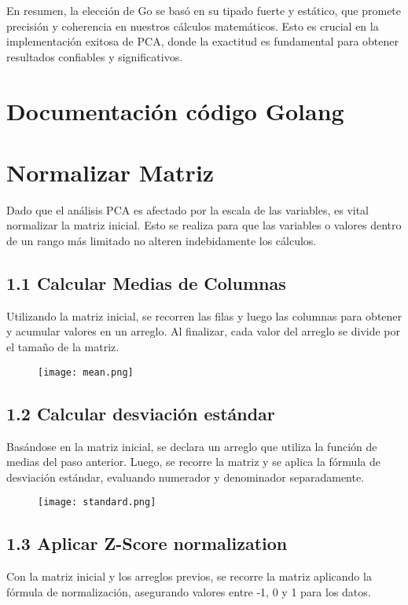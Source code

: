 \documentclass{article}
\begin{document}
En resumen, la elección de Go se basó en su tipado fuerte y estático, que promete precisión y coherencia en nuestros cálculos matemáticos. Esto es crucial en la implementación exitosa de PCA, donde la exactitud es fundamental para obtener resultados confiables y significativos.


\section*{Documentación código Golang}

\section{ Normalizar Matriz}Dado que el análisis PCA es afectado por la escala de las variables, es vital normalizar la matriz inicial. Esto se realiza para que las variables o valores dentro de un rango más limitado no alteren indebidamente los cálculos.

\subsection*{1.1 Calcular Medias de Columnas}
Utilizando la matriz inicial, se recorren las filas y luego las columnas para obtener y acumular valores en un arreglo. Al finalizar, cada valor del arreglo se divide por el tamaño de la matriz.

\begin{figure}[h]
    \centering
    \texttt{[image: mean.png]}
    \label{fig:my_label}
\end{figure}


\subsection*{1.2 Calcular desviación estándar}
Basándose en la matriz inicial, se declara un arreglo que utiliza la función de medias del paso anterior. Luego, se recorre la matriz y se aplica la fórmula de desviación estándar, evaluando numerador y denominador separadamente.

\begin{figure}[h]
    \centering
    \texttt{[image: standard.png]}
    \label{fig:my_label}
\end{figure}

\subsection*{1.3 Aplicar Z-Score normalization}
Con la matriz inicial y los arreglos previos, se recorre la matriz aplicando la fórmula de normalización, asegurando valores entre -1, 0 y 1 para los datos.
\end{document}
